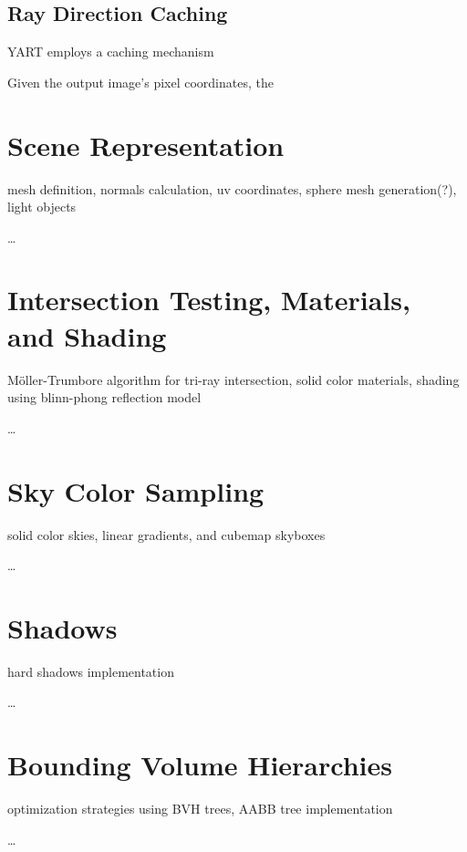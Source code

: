 \subsection{Ray Direction Caching}

YART employs a caching mechanism

Given the output image's pixel coordinates, the 

\section{Scene Representation}

mesh definition, normals calculation, uv coordinates, sphere mesh generation(?), light objects

\dots

\section{Intersection Testing, Materials, and Shading}

Möller-Trumbore algorithm for tri-ray intersection, solid color materials, shading using blinn-phong reflection model

\dots

\section{Sky Color Sampling}

solid color skies, linear gradients, and cubemap skyboxes

\dots

\section{Shadows}

hard shadows implementation

\dots

\section{Bounding Volume Hierarchies}

optimization strategies using BVH trees, AABB tree implementation

\dots
